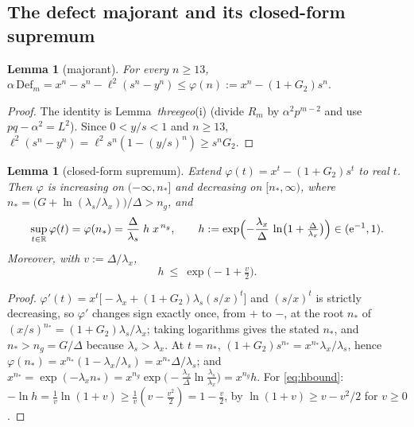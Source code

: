 \documentclass[11pt]{article}
\newtheorem{lemma}[theorem]{Lemma}
\theoremstyle{remark}
\theoremstyle{plain}
\theoremstyle{plain}
\newcommand{\eu}{\mathrm{e}}
\begin{document}
\subsection{The defect majorant and its closed-form supremum}\label{sec:zoneC-majorant}

\begin{lemma}[majorant]\label{lem:zc-majorant}
For every $n\ge13$,
\(
 \alpha\,\mathrm{Def}_m
 = x^n-s^n-\ell^2(s^n-y^n)
 \le \varphi(n):=x^n-(1+G_2)s^n .
\)
\end{lemma}

\begin{proof}
The identity is Lemma~\emph{threegeo}(i) (divide $R_m$ by $\alpha^2p^{m-2}$
and use $pq-\alpha^2=L^2$).  Since $0<y/s<1$ and $n\ge13$,
$\ell^2(s^n-y^n)=\ell^2 s^n(1-(y/s)^n)\ge s^nG_2$.
\end{proof}

\begin{lemma}[closed-form supremum]\label{lem:zc-sup}
Extend $\varphi(t)=x^t-(1+G_2)s^t$ to real $t$.  Then $\varphi$ is increasing
on $(-\infty,n_*]$ and decreasing on $[n_*,\infty)$, where
$n_*=\bigl(G+\ln(\lambda_s/\lambda_x)\bigr)/\Delta>n_g$, and
\begin{equation}\label{eq:phistar}
 \sup_{t\in\mathbb R}\varphi(t)=\varphi(n_*)
 =\frac{\Delta}{\lambda_s}\;h\;x^{\,n_g},
 \qquad
 h:=\exp\Bigl(-\frac{\lambda_x}{\Delta}\,
 \ln\bigl(1+\tfrac\Delta{\lambda_x}\bigr)\Bigr)\in(\eu^{-1},1).
\end{equation}
Moreover, with $v:=\Delta/\lambda_x$,
\begin{equation}\label{eq:hbound}
 h\ \le\ \exp\bigl(-1+\tfrac v2\bigr).
\end{equation}
\end{lemma}

\begin{proof}
$\varphi'(t)=x^t\bigl[-\lambda_x+(1+G_2)\lambda_s(s/x)^t\bigr]$ and
$(s/x)^t$ is strictly decreasing, so $\varphi'$ changes sign exactly once,
from $+$ to $-$, at the root $n_*$ of
$(x/s)^{n_*}=(1+G_2)\lambda_s/\lambda_x$; taking logarithms gives the stated
$n_*$, and $n_*>n_g=G/\Delta$ because $\lambda_s>\lambda_x$.  At $t=n_*$,
$(1+G_2)s^{n_*}=x^{n_*}\lambda_x/\lambda_s$, hence
$\varphi(n_*)=x^{n_*}(1-\lambda_x/\lambda_s)=x^{n_*}\Delta/\lambda_s$; and
$x^{n_*}=\exp(-\lambda_xn_*)
 =x^{n_g}\exp\bigl(-\tfrac{\lambda_x}\Delta\ln\tfrac{\lambda_s}{\lambda_x}\bigr)
 =x^{n_g}h$.
For \eqref{eq:hbound}: $-\ln h=\tfrac1v\ln(1+v)\ge\tfrac1v(v-\tfrac{v^2}2)
=1-\tfrac v2$, by $\ln(1+v)\ge v-v^2/2$ for $v\ge0$.
\end{proof}
\end{document}
